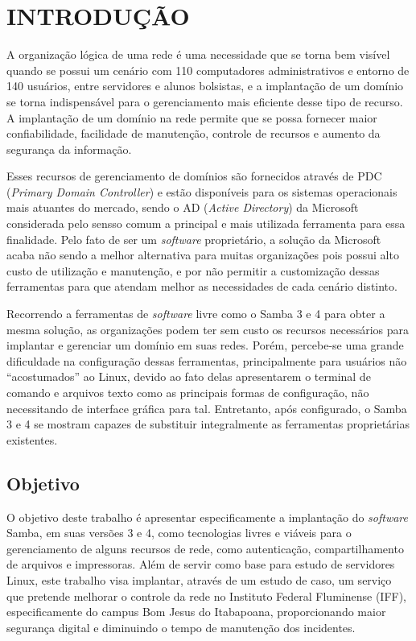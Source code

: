 \chapter{INTRODUÇÃO}

A organização lógica de uma rede é uma necessidade que se torna bem visível quando se possui um cenário com 110 computadores administrativos e entorno de 140 usuários, entre servidores e alunos bolsistas, e a implantação de um domínio se torna indispensável para o gerenciamento mais eficiente desse tipo de recurso. A implantação de um domínio na rede permite que se possa fornecer maior confiabilidade, facilidade de manutenção, controle de recursos e aumento da segurança da informação.

Esses recursos de gerenciamento de domínios são fornecidos através de PDC (\textit{Primary Domain Controller}) e estão disponíveis para os sistemas operacionais mais atuantes do mercado, sendo o AD (\textit{Active Directory}) da Microsoft considerada pelo sensso comum a principal e mais utilizada ferramenta para essa finalidade. Pelo fato de ser um \textit{software} proprietário, a solução da Microsoft acaba não sendo a melhor alternativa para muitas organizações pois possui alto custo de utilização e manutenção, e por não permitir a customização dessas ferramentas para que atendam melhor as necessidades de cada cenário distinto.

Recorrendo a ferramentas de \textit{software} livre como o Samba 3 e 4 para obter a mesma solução, as organizações podem ter sem custo os recursos necessários para implantar e gerenciar um domínio em suas redes. Porém, percebe-se uma grande dificuldade na configuração dessas ferramentas, principalmente para usuários não “acostumados” ao Linux, devido ao fato delas apresentarem o terminal de comando e arquivos texto como as principais formas de configuração, não necessitando de interface gráfica para tal. Entretanto, após configurado, o Samba 3 e 4 se mostram capazes de substituir integralmente as ferramentas proprietárias existentes.

\section{Objetivo}

O objetivo deste trabalho é apresentar especificamente a implantação do \textit{software} Samba, em suas versões 3 e 4, como tecnologias livres e viáveis para o gerenciamento de alguns recursos de rede, como autenticação, compartilhamento de arquivos e impressoras. Além de servir como base para estudo de servidores Linux, este trabalho visa implantar, através de um estudo de caso, um serviço que pretende melhorar o controle da rede no Instituto Federal Fluminense (IFF), especificamente do campus Bom Jesus do Itabapoana, proporcionando maior segurança digital e diminuindo o tempo de manutenção dos incidentes.

